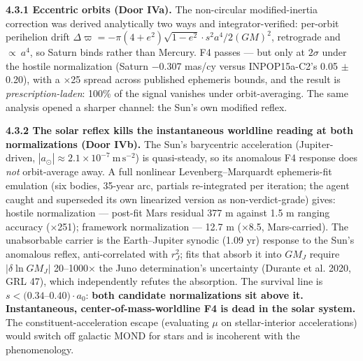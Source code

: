 \documentclass[11pt,a4paper]{article}
\begin{document}
\textbf{4.3.1 Eccentric orbits (Door IVa).} The non-circular modified-inertia correction was derived analytically two ways and integrator-verified: per-orbit perihelion drift $\Delta\varpi = -\pi(4+e^2)\sqrt{1-e^2}\cdot s^2a^4/2(GM)^2$, retrograde and $\propto\ a^{4}$, so Saturn binds rather than Mercury. F4 passes --- but only at $2\sigma$ under the hostile normalization (Saturn $-$0.307 mas/cy versus INPOP15a-C2's 0.05 $\pm$ 0.20), with a $\times$25 spread across published ephemeris bounds, and the result is \emph{prescription-laden}: 100\% of the signal vanishes under orbit-averaging. The same analysis opened a sharper channel: the Sun's own modified reflex.

\textbf{4.3.2 The solar reflex kills the instantaneous worldline reading at both normalizations (Door IVb).} The Sun's barycentric acceleration (Jupiter-driven, $|a_\odot| \approx 2.1\times10^{-7}\ \mathrm{m\,s^{-2}}$) is quasi-steady, so its anomalous F4 response does \emph{not} orbit-average away. A full nonlinear Levenberg--Marquardt ephemeris-fit emulation (six bodies, 35-year arc, partials re-integrated per iteration; the agent caught and superseded its own linearized version as non-verdict-grade) gives: hostile normalization --- post-fit Mars residual 377 m against 1.5 m ranging accuracy ($\times$251); framework normalization --- 12.7 m ($\times$8.5, Mars-carried). The unabsorbable carrier is the Earth--Jupiter synodic (1.09 yr) response to the Sun's anomalous reflex, anti-correlated with $r_J^2$; fits that absorb it into $GM_J$ require $|\delta\ln GM_J|$ 20--1000$\times$ the Juno determination's uncertainty (Durante et al. 2020, GRL 47), which independently refutes the absorption. The survival line is $s < (0.34$--$0.40)\cdot a_0$: \textbf{both candidate normalizations sit above it. Instantaneous, center-of-mass-worldline F4 is dead in the solar system.} The constituent-acceleration escape (evaluating $\mu$ on stellar-interior accelerations) would switch off galactic MOND for stars and is incoherent with the phenomenology.
\end{document}
